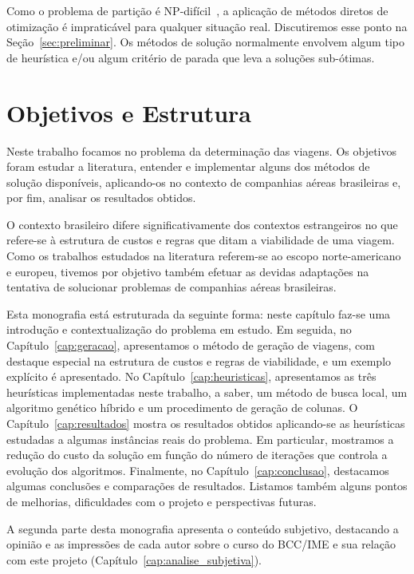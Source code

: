 Como o problema de partição é NP-difícil~\cite{garey79}, a aplicação de métodos diretos de
otimização é impraticável para qualquer situação real. Discutiremos esse ponto na
Seção~\ref{sec:preliminar}. Os métodos de solução normalmente envolvem algum tipo de heurística e/ou
algum critério de parada que leva a soluções sub-ótimas.


\section{Objetivos e Estrutura}
\label{sec:objetivos}

Neste trabalho focamos no problema da determinação das viagens. Os objetivos foram estudar a 
literatura, entender e implementar alguns dos métodos de solução disponíveis, aplicando-os
no contexto de companhias aéreas brasileiras e, por fim, analisar os resultados obtidos.

O contexto brasileiro difere significativamente dos contextos estrangeiros no que refere-se à 
estrutura de custos e regras que ditam a viabilidade de uma viagem. Como os trabalhos estudados na
literatura referem-se ao escopo norte-americano e europeu, tivemos por objetivo também efetuar as 
devidas adaptações na tentativa de solucionar problemas de companhias aéreas brasileiras.

Esta monografia está estruturada da seguinte forma: neste capítulo faz-se uma introdução e
contextualização do problema em estudo. Em seguida, no Capítulo~\ref{cap:geracao}, apresentamos o
método de geração de viagens, com destaque especial na estrutura de custos e regras de viabilidade,
e um exemplo explícito é apresentado. No Capítulo~\ref{cap:heuristicas}, apresentamos as três
heurísticas implementadas neste trabalho, a saber, um método de busca local, um algoritmo genético
híbrido e um procedimento de geração de colunas. O Capítulo~\ref{cap:resultados} mostra os
resultados obtidos aplicando-se as heurísticas estudadas a algumas instâncias reais do problema. Em
particular, mostramos a redução do custo da solução em função do número de iterações que controla a
evolução dos algoritmos. Finalmente, no Capítulo~\ref{cap:conclusao}, destacamos algumas conclusões
e comparações de resultados. Listamos também alguns pontos de melhorias, dificuldades com o projeto
e perspectivas futuras.

A segunda parte desta monografia apresenta o conteúdo subjetivo, destacando a opinião e as
impressões de cada autor sobre o curso do BCC/IME e sua relação com este projeto
(Capítulo~\ref{cap:analise_subjetiva}).